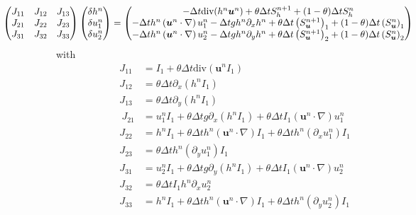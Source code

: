 \documentclass[a4paper, 11pt]{article}
\begin{document}
\begin{equation*}
\begin{split}
\hspace*{-2cm}\begin{pmatrix}
J_{11} & J_{12} & J_{13} \\
J_{21}& J_{22}& J_{23}\\
J_{31}& J_{32}& J_{33}
\end{pmatrix}\begin{pmatrix}
\delta h^n\\\delta u_1^n\\\delta u_2^n\end{pmatrix}
=\begin{pmatrix}-\Delta t\text{div}(h^n\boldsymbol{u}^n)+\theta \Delta tS_h^{n+1}+(1-\theta)\Delta tS_h^{n}\\-\Delta th^n\left(\boldsymbol{u}^n\cdot\nabla\right)u_1^n-\Delta tgh^n\partial_xh^n+\theta \Delta t\left(S_{\boldsymbol{u}}^{n+1}\right)_1+(1-\theta)\Delta t\left(S_{\boldsymbol{u}}^n\right)_1\\-\Delta th^n\left(\boldsymbol{u}^n\cdot\nabla\right)u_2^n-\Delta tgh^n\partial_y h^n+\theta \Delta t\left(S_{\boldsymbol{u}}^{n+1}\right)_2+(1-\theta)\Delta t\left(S_{\boldsymbol{u}}^n\right)_2\end{pmatrix}
\end{split}
\end{equation*}
with
\begin{align*}
J_{11} &=  I_1+\theta\Delta t\text{div}\left(\boldsymbol{u}^nI_1\right)\\
J_{12} & = \theta\Delta t\partial_x\left(h^nI_1\right)\\
J_{13} & =\theta\Delta t\partial_y\left(h^nI_1\right)\\\
J_{21} &= u^n_1I_1+\theta\Delta t g\partial_x\left(h^nI_1\right)+\theta\Delta tI_1\left(\boldsymbol{u}^n\cdot\nabla\right)u_1^n\\
J_{22} &= h^nI_1+\theta\Delta th^n\left(\boldsymbol{u}^n\cdot \nabla\right)I_1+\theta\Delta th^n(\partial_xu_1^n)I_1\\
J_{23} &= \theta\Delta th^n(\partial_yu_1^n)I_1\\
J_{31} &= u_2^nI_1+\theta\Delta tg\partial_y\left(h^nI_1\right)+\theta\Delta tI_1\left(\boldsymbol{u}^n\cdot\nabla\right)u_2^n\\
J_{32} &= \theta\Delta tI_1h^n\partial_xu_2^n \\
J_{33} &= h^nI_1+\theta\Delta th^n\left(\boldsymbol{u}^n\cdot\nabla\right)I_1+\theta\Delta th^n(\partial_yu_2^n)I_1
\end{align*}
\end{document}
